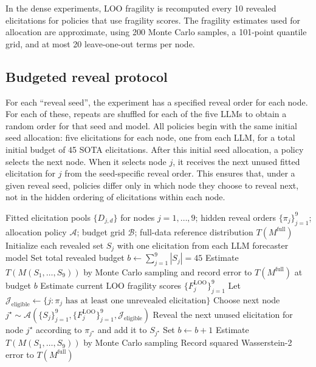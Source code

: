 \documentclass[11pt]{article}
\begin{document}
In the dense experiments, LOO fragility is recomputed every 10 revealed elicitations for policies that use fragility scores. The fragility estimates used for allocation are approximate, using 200 Monte Carlo samples, a 101-point quantile grid, and at most 20 leave-one-out terms per node.

\subsection{Budgeted reveal protocol}

For each ``reveal seed'', the experiment has a specified reveal order for each node. For each of these, repeats are shuffled for each of the five LLMs to obtain a random order for that seed and model. All policies begin with the same initial seed allocation: five elicitations for each node, one from each LLM, for a total initial budget of 45 SOTA elicitations. After this initial seed allocation, a policy selects the next node. When it selects node $j$, it receives the next unused fitted elicitation for $j$ from the seed-specific reveal order. This ensures that, under a given reveal seed, policies differ only in which node they choose to reveal next, not in the hidden ordering of elicitations within each node.

\begin{algorithm}[htbp]
\caption{Retrospective budget-recovery experiment for one reveal seed and policy}
\label{alg:budget-recovery}
\begin{algorithmic}[1]
\Require Fitted elicitation pools $\{D_{j,d}\}$ for nodes $j=1,\ldots,9$; hidden reveal orders $\{\pi_j\}_{j=1}^9$; allocation policy $\mathcal{A}$; budget grid $\mathcal{B}$; full-data reference distribution $T(M^{\mathrm{full}})$
\State Initialize each revealed set $S_j$ with one elicitation from each LLM forecaster model
\State Set total revealed budget $b \gets \sum_{j=1}^9 |S_j| = 45$
\State Estimate $T(M(S_1,\ldots,S_9))$ by Monte Carlo sampling and record error to $T(M^{\mathrm{full}})$ at budget $b$
        \State Estimate current LOO fragility scores $\{F_j^{\mathrm{LOO}}\}_{j=1}^9$
    \EndIf
    \State Let $\mathcal{J}_{\mathrm{eligible}} \gets \{j : \pi_j \text{ has at least one unrevealed elicitation}\}$
    \State Choose next node $j^\star \sim \mathcal{A}\!\left(\{S_j\}_{j=1}^9,\{F_j^{\mathrm{LOO}}\}_{j=1}^9,\mathcal{J}_{\mathrm{eligible}}\right)$
    \State Reveal the next unused elicitation for node $j^\star$ according to $\pi_{j^\star}$ and add it to $S_{j^\star}$
    \State Set $b \gets b+1$
        \State Estimate $T(M(S_1,\ldots,S_9))$ by Monte Carlo sampling
        \State Record squared Wasserstein-2 error to $T(M^{\mathrm{full}})$
    \EndIf
\EndWhile
\end{algorithmic}
\end{algorithm}
\end{document}
